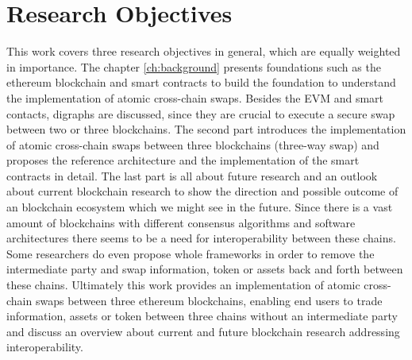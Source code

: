 \section{Research Objectives}
\label{sec:intro:goal}
This work covers three research objectives in general, which are equally weighted in importance. The chapter \ref{ch:background} presents foundations such as the ethereum blockchain and smart contracts to build the foundation to understand the implementation of atomic cross-chain swaps. Besides the \ac{EVM} and smart contacts, digraphs are discussed, since they are crucial to execute a secure swap between two or three blockchains. The second part introduces the implementation of atomic cross-chain swaps between three blockchains (three-way swap) and proposes the reference architecture and the implementation of the smart contracts in detail. The last part is all about future research and an outlook about current blockchain research to show the direction and possible outcome of an blockchain ecosystem which we might see in the future. Since there is a vast amount of blockchains with different consensus algorithms and software architectures there seems to be a need for interoperability between these chains. Some researchers do even propose whole frameworks in order to remove the intermediate party and swap information, token or assets back and forth between these chains. Ultimately this work provides an implementation of atomic cross-chain swaps between three ethereum blockchains, enabling end users to trade information, assets or token between three chains without an intermediate party and discuss an overview about current and future blockchain research addressing interoperability.


%
%
